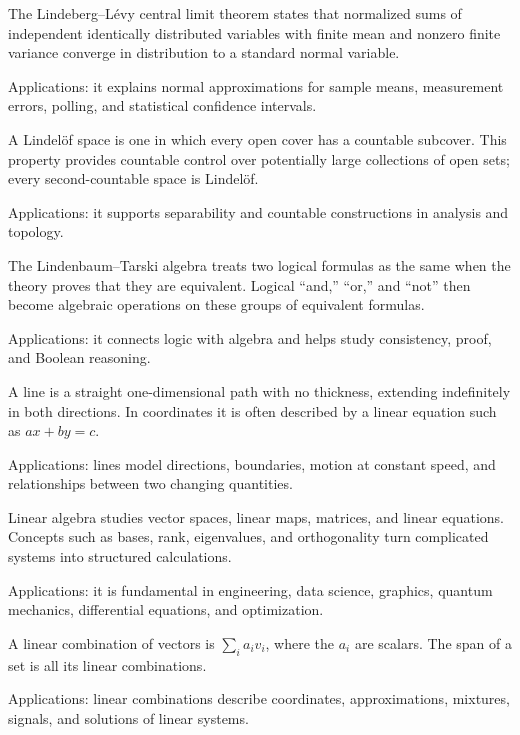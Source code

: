The Lindeberg--Lévy central limit theorem states that normalized sums of independent identically distributed variables with finite mean and nonzero finite variance converge in distribution to a standard normal variable. \par\noindent Applications: it explains normal approximations for sample means, measurement errors, polling, and statistical confidence intervals.

A Lindelöf space is one in which every open cover has a countable subcover. This property provides countable control over potentially large collections of open sets; every second-countable space is Lindelöf. \par\noindent Applications: it supports separability and countable constructions in analysis and topology.

The Lindenbaum--Tarski algebra treats two logical formulas as the same when the theory proves that they are equivalent. Logical “and,” “or,” and “not” then become algebraic operations on these groups of equivalent formulas. \par\noindent Applications: it connects logic with algebra and helps study consistency, proof, and Boolean reasoning.

A line is a straight one-dimensional path with no thickness, extending indefinitely in both directions. In coordinates it is often described by a linear equation such as $ax+by=c$. \par\noindent Applications: lines model directions, boundaries, motion at constant speed, and relationships between two changing quantities.

Linear algebra studies vector spaces, linear maps, matrices, and linear equations. Concepts such as bases, rank, eigenvalues, and orthogonality turn complicated systems into structured calculations. \par\noindent Applications: it is fundamental in engineering, data science, graphics, quantum mechanics, differential equations, and optimization.

A linear combination of vectors is $\sum_i a_iv_i$, where the $a_i$ are scalars. The span of a set is all its linear combinations. \par\noindent Applications: linear combinations describe coordinates, approximations, mixtures, signals, and solutions of linear systems.

